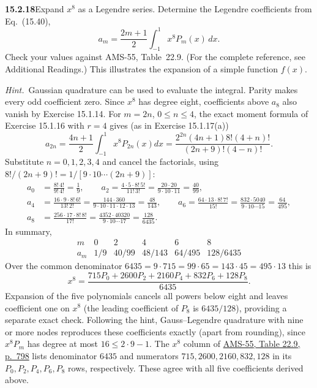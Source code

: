 \par\bigskip
\noindent\textbf{15.2.18}\quad Expand $x^{8}$ as a Legendre series.
Determine the Legendre coefficients from Eq.~(15.40),
\[
a_{m}=\frac{2m+1}{2}\int_{-1}^{1}x^{8}P_{m}(x)\,dx.
\]
Check your values against AMS-55, Table~22.9. (For the complete
reference, see Additional Readings.) This illustrates the expansion
of a simple function $f(x)$.
\par\emph{Hint.}~Gaussian quadrature can be used to evaluate the
integral.
\solution
Parity makes every odd coefficient zero. Since $x^8$ has degree eight,
coefficients above $a_8$ also vanish by Exercise 15.1.14.
For $m=2n$, $0\le n\le4$, the exact moment formula of
Exercise 15.1.16 with $r=4$ gives (as in Exercise 15.1.17(a))
\[
a_{2n}=\frac{4n+1}{2}\int_{-1}^1x^8P_{2n}(x)dx
=\frac{2^{2n}(4n+1)8!(4+n)!}{(2n+9)!(4-n)!}.
\]
Substitute $n=0,1,2,3,4$ and cancel the factorials, using
$8!/(2n+9)!=1/[9\cdot10\cdots(2n+9)]$:
\begin{align*}
a_0&=\frac{8!\,4!}{9!\,4!}=\frac19,\qquad
a_2=\frac{4\cdot5\cdot8!\,5!}{11!\,3!}=\frac{20\cdot20}{9\cdot10\cdot11}
=\frac{40}{99},\\
a_4&=\frac{16\cdot9\cdot8!\,6!}{13!\,2!}
=\frac{144\cdot360}{9\cdot10\cdot11\cdot12\cdot13}=\frac{48}{143},\qquad
a_6=\frac{64\cdot13\cdot8!\,7!}{15!}
=\frac{832\cdot5040}{9\cdot10\cdots15}=\frac{64}{495},\\
a_8&=\frac{256\cdot17\cdot8!\,8!}{17!}
=\frac{4352\cdot40320}{9\cdot10\cdots17}=\frac{128}{6435}.
\end{align*}
In summary,
\[
\begin{array}{c|ccccc}
m&0&2&4&6&8\\\hline
a_m&1/9&40/99&48/143&64/495&128/6435
\end{array}
\]
Over the common denominator $6435=9\cdot715=99\cdot65=143\cdot45
=495\cdot13$ this is
\[
\boxed{x^8=\frac{715P_0+2600P_2+2160P_4+832P_6+128P_8}{6435}}.
\]
Expansion of the five polynomials cancels all powers below eight and
leaves coefficient one on $x^8$ (the leading coefficient of $P_8$ is
$6435/128$), providing a separate exact check.
Following the hint, Gauss--Legendre quadrature with nine or more nodes
reproduces these coefficients exactly (apart from rounding), since
$x^8P_m$ has degree at most $16\le2\cdot9-1$.
The $x^8$ column of
\href{https://digital.library.unt.edu/ark:/67531/metadc40302/m1/814/}
{AMS-55, Table 22.9, p.~798}
lists denominator $6435$ and numerators $715,2600,2160,832,128$
in its $P_0,P_2,P_4,P_6,P_8$ rows, respectively. These agree with
all five coefficients derived above.

